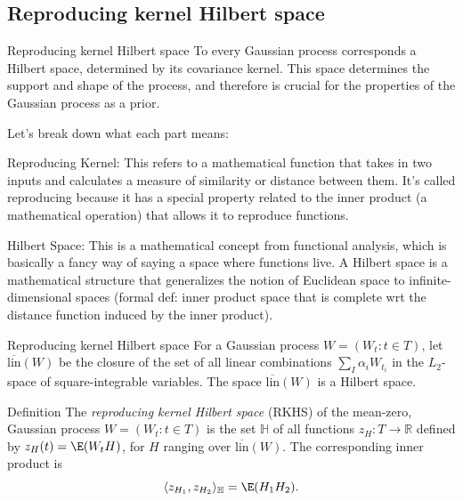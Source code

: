 \subsection{Reproducing kernel Hilbert space}

\begin{frame}{Reproducing kernel Hilbert space}
	To every Gaussian process corresponds a Hilbert space, determined by its covariance kernel. This space determines the support and shape of the process, and therefore is crucial for the properties of the Gaussian process as a prior. 

\pause

Let's break down what each part means:

\alert{Reproducing Kernel}: This refers to a mathematical function that takes in two inputs and calculates a measure of similarity or distance between them. It's called \alert{reproducing} because it has a special property related to the inner product (a mathematical operation) that allows it to reproduce functions.

\alert{Hilbert Space}: This is a mathematical concept from functional analysis, which is basically a fancy way of saying a space where functions live. A Hilbert space is a mathematical structure that generalizes the notion of Euclidean space to infinite-dimensional spaces (formal def: inner product space that is complete wrt the distance function induced by the inner product).

%
\end{frame}


\begin{frame}{Reproducing kernel Hilbert space}
For a Gaussian process $W = (W_t : t \in T)$, let $\overline{\text{lin}}(W)$ be the closure of the set of all linear combinations $\sum_I \alpha_i W_{t_i}$ in the $L_2$-space of square-integrable variables. The space $\overline{\text{lin}}(W)$ is a Hilbert space.

\pause

\begin{block}{Definition} 
The \textit{reproducing kernel Hilbert space} (RKHS) of the mean-zero, Gaussian process $W = (W_t : t \in T )$ is the set $\mathbb{H}$ of all functions $z_H:T \to \mathbb{R}$ defined by $z_H(t) = \E(W_t H)$, for $H$ ranging over $\overline{\text{lin}}(W)$. The corresponding inner product is
	$$\langle z_{H_1},z_{H_2}\rangle_{\mathbb{H}} =  \E (H_1H_2).$$
\end{block}
\end{frame}


